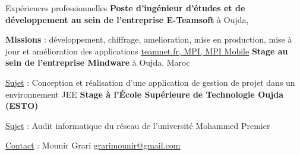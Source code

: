 \begin{rubric}{Expériences professionnelles}
%
%
	\textbf{Poste d'ingénieur d'études et de développement au sein de l’entreprise E-Teamsoft} à Oujda, 
     \hfill{} 
	\par \textbf{Missions} : développement, chiffrage, amelioration, mise en production,
                              mise à jour et amélioration des applications \url{teamnet.fr, MPI, MPI Mobile} 
%
%
%
	\textbf{Stage au sein de l’entreprise Mindware} à Oujda, Maroc
     \hfill{} 
    \par \underline{Sujet} : {Conception et réalisation d'une application de gestion de projet dans un environnement JEE}
%
    \textbf{Stage à l’École Supérieure de Technologie Oujda (ESTO)}
     \hfill{} 
    \par \underline{Sujet} : {Audit informatique du réseau de l'université Mohammed Premier}
	\par \underline{Contact} : Mounir Grari \href{mailto:grarimounir@gmail.com}{grarimounir@gmail.com}
%
%
%
\end{rubric}

